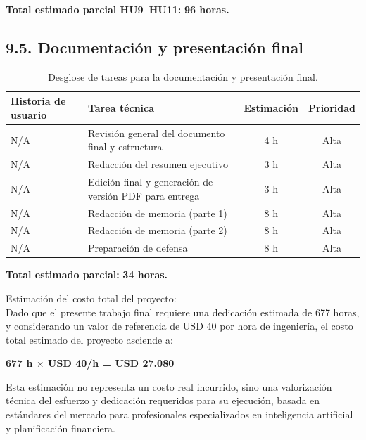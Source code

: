 \documentclass[
11pt, %
]{charter}
\begin{document}
\vspace{0.5cm}
\noindent
\textbf{Total estimado parcial HU9–HU11:} \textbf{96 horas.}

\subsection*{9.5. Documentación y presentación final}

\begin{table}[H]
\centering
\begin{tabular}{|l|p{6cm}|c|c|}
\hline
\textbf{Historia de usuario} & \textbf{Tarea técnica} & \textbf{Estimación} & \textbf{Prioridad} \\
\hline
N/A & Revisión general del documento final y estructura & 4 h & Alta \\
N/A & Redacción del resumen ejecutivo & 3 h & Alta \\
N/A & Edición final y generación de versión PDF para entrega & 3 h & Alta \\
N/A & Redacción de memoria (parte 1) & 8 h & Alta \\
N/A & Redacción de memoria (parte 2) & 8 h & Alta \\
N/A & Preparación de defensa & 8 h & Alta \\
\hline
\end{tabular}
\caption{Desglose de tareas para la documentación y presentación final.}
\end{table}

\vspace{0.5cm}
\noindent
\textbf{Total estimado parcial:} \textbf{34 horas.}

\noindent
Estimación del costo total del proyecto: \\
Dado que el presente trabajo final requiere una dedicación estimada de 677 horas, y considerando un valor de referencia de USD 40 por hora de ingeniería, el costo total estimado del proyecto asciende a:

\begin{center}
\textbf{677 h $\times$ USD 40/h = USD 27.080}
\end{center}

Esta estimación no representa un costo real incurrido, sino una valorización técnica del esfuerzo y dedicación requeridos para su ejecución, basada en estándares del mercado para profesionales especializados en inteligencia artificial y planificación financiera.

\vspace{0.2cm}
\noindent\dotfill
\end{document}
